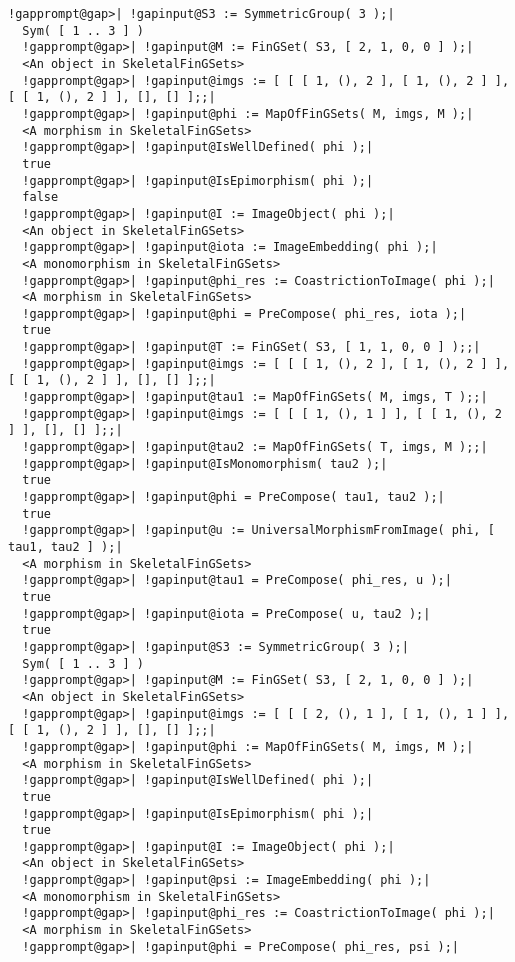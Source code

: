 \documentclass[a4paper,11pt]{report}
\begin{document}
{{{\begin{Verbatim}[commandchars=!@|,fontsize=\small,frame=single,label=Example]
  !gapprompt@gap>| !gapinput@S3 := SymmetricGroup( 3 );|
  Sym( [ 1 .. 3 ] )
  !gapprompt@gap>| !gapinput@M := FinGSet( S3, [ 2, 1, 0, 0 ] );|
  <An object in SkeletalFinGSets>
  !gapprompt@gap>| !gapinput@imgs := [ [ [ 1, (), 2 ], [ 1, (), 2 ] ], [ [ 1, (), 2 ] ], [], [] ];;|
  !gapprompt@gap>| !gapinput@phi := MapOfFinGSets( M, imgs, M );|
  <A morphism in SkeletalFinGSets>
  !gapprompt@gap>| !gapinput@IsWellDefined( phi );|
  true
  !gapprompt@gap>| !gapinput@IsEpimorphism( phi );|
  false
  !gapprompt@gap>| !gapinput@I := ImageObject( phi );|
  <An object in SkeletalFinGSets>
  !gapprompt@gap>| !gapinput@iota := ImageEmbedding( phi );|
  <A monomorphism in SkeletalFinGSets>
  !gapprompt@gap>| !gapinput@phi_res := CoastrictionToImage( phi );|
  <A morphism in SkeletalFinGSets>
  !gapprompt@gap>| !gapinput@phi = PreCompose( phi_res, iota );|
  true
  !gapprompt@gap>| !gapinput@T := FinGSet( S3, [ 1, 1, 0, 0 ] );;|
  !gapprompt@gap>| !gapinput@imgs := [ [ [ 1, (), 2 ], [ 1, (), 2 ] ], [ [ 1, (), 2 ] ], [], [] ];;|
  !gapprompt@gap>| !gapinput@tau1 := MapOfFinGSets( M, imgs, T );;|
  !gapprompt@gap>| !gapinput@imgs := [ [ [ 1, (), 1 ] ], [ [ 1, (), 2 ] ], [], [] ];;|
  !gapprompt@gap>| !gapinput@tau2 := MapOfFinGSets( T, imgs, M );;|
  !gapprompt@gap>| !gapinput@IsMonomorphism( tau2 );|
  true
  !gapprompt@gap>| !gapinput@phi = PreCompose( tau1, tau2 );|
  true
  !gapprompt@gap>| !gapinput@u := UniversalMorphismFromImage( phi, [ tau1, tau2 ] );|
  <A morphism in SkeletalFinGSets>
  !gapprompt@gap>| !gapinput@tau1 = PreCompose( phi_res, u );|
  true
  !gapprompt@gap>| !gapinput@iota = PreCompose( u, tau2 );|
  true
  !gapprompt@gap>| !gapinput@S3 := SymmetricGroup( 3 );|
  Sym( [ 1 .. 3 ] )
  !gapprompt@gap>| !gapinput@M := FinGSet( S3, [ 2, 1, 0, 0 ] );|
  <An object in SkeletalFinGSets>
  !gapprompt@gap>| !gapinput@imgs := [ [ [ 2, (), 1 ], [ 1, (), 1 ] ], [ [ 1, (), 2 ] ], [], [] ];;|
  !gapprompt@gap>| !gapinput@phi := MapOfFinGSets( M, imgs, M );|
  <A morphism in SkeletalFinGSets>
  !gapprompt@gap>| !gapinput@IsWellDefined( phi );|
  true
  !gapprompt@gap>| !gapinput@IsEpimorphism( phi );|
  true
  !gapprompt@gap>| !gapinput@I := ImageObject( phi );|
  <An object in SkeletalFinGSets>
  !gapprompt@gap>| !gapinput@psi := ImageEmbedding( phi );|
  <A monomorphism in SkeletalFinGSets>
  !gapprompt@gap>| !gapinput@phi_res := CoastrictionToImage( phi );|
  <A morphism in SkeletalFinGSets>
  !gapprompt@gap>| !gapinput@phi = PreCompose( phi_res, psi );|

\end{Verbatim}}}}
\end{document}
